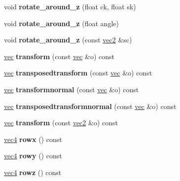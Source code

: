 \begin{DoxyCompactItemize}
void {\bfseries rotate\+\_\+around\+\_\+z} (float ck, float sk)
\item 
\mbox{\label{structmatrix4x3_a9e258bcc4561ca109557e6890d1210f4}} 
void {\bfseries rotate\+\_\+around\+\_\+z} (float angle)
\item 
\mbox{\label{structmatrix4x3_a1799db69a451e213c38deb40bf431373}} 
void {\bfseries rotate\+\_\+around\+\_\+z} (const \hyperlink{structvec2}{vec2} \&sc)
\item 
\mbox{\label{structmatrix4x3_a6aba5c28694cbd29266e8a681e51fa96}} 
\hyperlink{structvec}{vec} {\bfseries transform} (const \hyperlink{structvec}{vec} \&o) const
\item 
\mbox{\label{structmatrix4x3_a2306efdbbf3be06de48bda7f58163c6c}} 
\hyperlink{structvec}{vec} {\bfseries transposedtransform} (const \hyperlink{structvec}{vec} \&o) const
\item 
\mbox{\label{structmatrix4x3_ae4d62d02aadffc75a467c816780bfce1}} 
\hyperlink{structvec}{vec} {\bfseries transformnormal} (const \hyperlink{structvec}{vec} \&o) const
\item 
\mbox{\label{structmatrix4x3_a779e7c1450799a1fb2ff8181cc209c30}} 
\hyperlink{structvec}{vec} {\bfseries transposedtransformnormal} (const \hyperlink{structvec}{vec} \&o) const
\item 
\mbox{\label{structmatrix4x3_ab2b41a7a4eb1317f832e8a2e64d65000}} 
\hyperlink{structvec}{vec} {\bfseries transform} (const \hyperlink{structvec2}{vec2} \&o) const
\item 
\mbox{\label{structmatrix4x3_a0b0605e8124985f429a4b52ecf896829}} 
\hyperlink{structvec4}{vec4} {\bfseries rowx} () const
\item 
\mbox{\label{structmatrix4x3_a92906bab37544c652ea1850a89af9c4d}} 
\hyperlink{structvec4}{vec4} {\bfseries rowy} () const
\item 
\mbox{\label{structmatrix4x3_a79d87cc9edadf117492a32b618db1e4f}} 
\hyperlink{structvec4}{vec4} {\bfseries rowz} () const
\end{DoxyCompactItemize}
